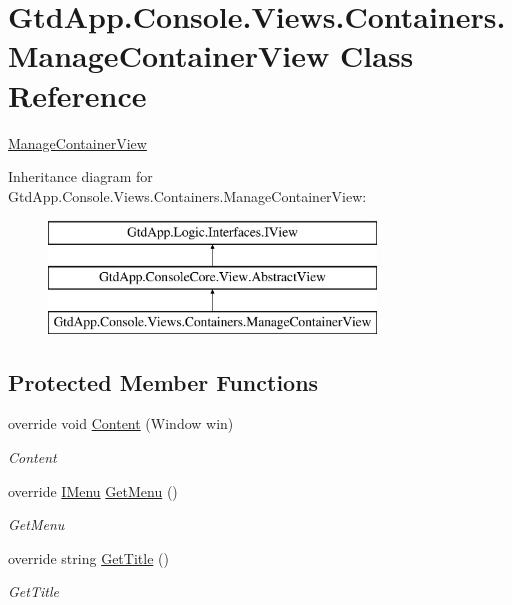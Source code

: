 \hypertarget{class_gtd_app_1_1_console_1_1_views_1_1_containers_1_1_manage_container_view}{}\section{Gtd\+App.\+Console.\+Views.\+Containers.\+Manage\+Container\+View Class Reference}
\label{class_gtd_app_1_1_console_1_1_views_1_1_containers_1_1_manage_container_view}


\mbox{\hyperlink{class_gtd_app_1_1_console_1_1_views_1_1_containers_1_1_manage_container_view}{Manage\+Container\+View}}  


Inheritance diagram for Gtd\+App.\+Console.\+Views.\+Containers.\+Manage\+Container\+View\+:\begin{figure}[H]
\begin{center}
\leavevmode
\includegraphics[height=3.000000cm]{class_gtd_app_1_1_console_1_1_views_1_1_containers_1_1_manage_container_view}
\end{center}
\end{figure}
\subsection*{Protected Member Functions}
\begin{DoxyCompactItemize}
\item 
override void \mbox{\hyperlink{class_gtd_app_1_1_console_1_1_views_1_1_containers_1_1_manage_container_view_affada33c424f2587976a73bceca5af2e}{Content}} (Window win)
\begin{DoxyCompactList}\small\item\em Content \end{DoxyCompactList}\item 
override \mbox{\hyperlink{interface_gtd_app_1_1_console_core_1_1_menu_1_1_i_menu}{I\+Menu}} \mbox{\hyperlink{class_gtd_app_1_1_console_1_1_views_1_1_containers_1_1_manage_container_view_aea83be4f40d02624136c8e0884f10d0b}{Get\+Menu}} ()
\begin{DoxyCompactList}\small\item\em Get\+Menu \end{DoxyCompactList}\item 
override string \mbox{\hyperlink{class_gtd_app_1_1_console_1_1_views_1_1_containers_1_1_manage_container_view_a027fb56977b1f2937bcf3fbd42505b57}{Get\+Title}} ()
\begin{DoxyCompactList}\small\item\em Get\+Title \end{DoxyCompactList}\end{DoxyCompactItemize}
